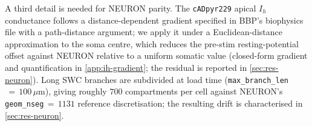A third detail is needed for NEURON parity. The \texttt{cADpyr229}
apical $I_h$ conductance follows a distance-dependent gradient
specified in BBP's biophysics file with a path-distance argument; we
apply it under a Euclidean-distance approximation to the soma centre,
which reduces the pre-stim resting-potential offset against NEURON
relative to a uniform somatic value (closed-form gradient and
quantification in \cref{app:ih-gradient}; the residual is reported in
\cref{sec:res-neuron}). Long SWC
branches are subdivided at load time
(\texttt{max\_branch\_len}$\,=\,100\,\mu$m), giving roughly $700$
compartments per cell against NEURON's \texttt{geom\_nseg}$\,=\,1131$
reference discretisation; the resulting drift is characterised in
\cref{sec:res-neuron}.

